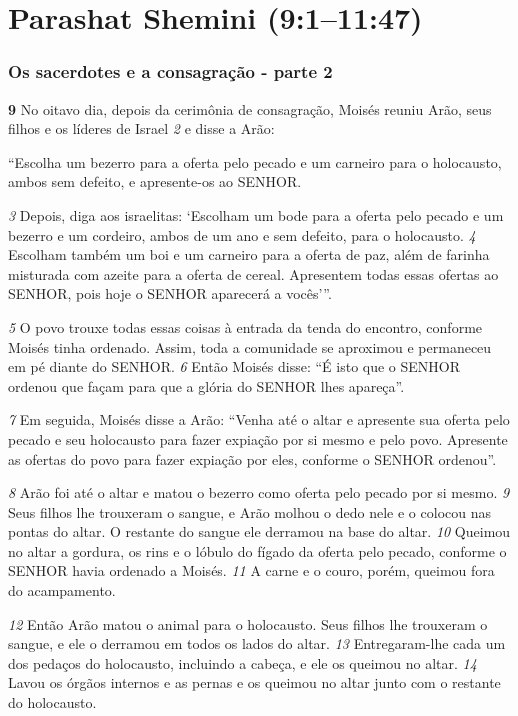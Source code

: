 \section*{Parashat Shemini (9:1–11:47)}

\subsubsection*{Os sacerdotes e a consagração - parte 2}
\textbf{\large 9} No oitavo dia, depois da cerimônia de consagração, Moisés reuniu Arão, seus
filhos e os líderes de Israel 
\textit{\tiny 2} 
e disse a Arão: 

\smallskip
“Escolha um bezerro para a oferta pelo
pecado e um carneiro para o holocausto, ambos sem defeito, e apresente-os ao
SENHOR. 

\smallskip
\textit{\tiny 3} 
Depois, diga aos israelitas: ‘Escolham um bode para a oferta pelo pecado
e um bezerro e um cordeiro, ambos de um ano e sem defeito, para o holocausto. 
\textit{\tiny 4} 
Escolham também um boi e um carneiro para a oferta de paz, além de farinha
misturada com azeite para a oferta de cereal. Apresentem todas essas ofertas ao
SENHOR, pois hoje o SENHOR aparecerá a vocês’”. 

\smallskip
\textit{\tiny 5} 
O povo trouxe todas essas coisas à entrada da tenda do encontro, conforme
Moisés tinha ordenado. Assim, toda a comunidade se aproximou e permaneceu
em pé diante do SENHOR. 
\textit{\tiny 6} 
Então Moisés disse: “É isto que o SENHOR ordenou que
façam para que a glória do SENHOR lhes apareça”. 

\smallskip
\textit{\tiny 7} 
Em seguida, Moisés disse a Arão: “Venha até o altar e apresente sua oferta pelo
pecado e seu holocausto para fazer expiação por si mesmo e pelo povo. Apresente
as ofertas do povo para fazer expiação por eles, conforme o SENHOR ordenou”. 

\smallskip
\textit{\tiny 8} 
Arão foi até o altar e matou o bezerro como oferta pelo pecado por si mesmo. 
\textit{\tiny 9} 
Seus filhos lhe trouxeram o sangue, e Arão molhou o dedo nele e o colocou nas
pontas do altar. O restante do sangue ele derramou na base do altar. 
\textit{\tiny 10}
Queimou
no altar a gordura, os rins e o lóbulo do fígado da oferta pelo pecado, conforme o
SENHOR havia ordenado a Moisés. 
\textit{\tiny 11}
A carne e o couro, porém, queimou fora do
acampamento.

\smallskip
\textit{\tiny 12}
Então Arão matou o animal para o holocausto. Seus filhos lhe trouxeram o
sangue, e ele o derramou em todos os lados do altar. 
\textit{\tiny 13}
Entregaram-lhe cada um
dos pedaços do holocausto, incluindo a cabeça, e ele os queimou no altar. 
\textit{\tiny 14}
Lavou
os órgãos internos e as pernas e os queimou no altar junto com o restante do
holocausto.

